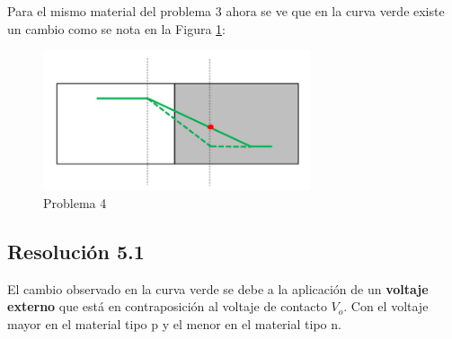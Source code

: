 \documentclass[
  11pt,
  letterpaper,
   addpoints,
  ]{exam}
\begin{document}
\begin{questions}
\question
Para el mismo material del problema 3 ahora se ve que en la curva verde existe un cambio como se nota en la Figura \ref{fig:p4}:


\begin{figure}[H]
    \centering
    \includegraphics[width=0.7\textwidth]{../figures/Auxiliar_2_2}
    \caption{Problema 4}
    \label{fig:p4}
\end{figure}
\begin{solution}
    \subsection*{Resolución 5.1}

    El cambio observado en la curva verde se debe a la aplicación de un \textbf{voltaje externo} que está en contraposición al voltaje de contacto $V_o$. Con el voltaje mayor en el material tipo p y el menor en el material tipo n.


\end{solution}
\end{questions}
\end{document}
